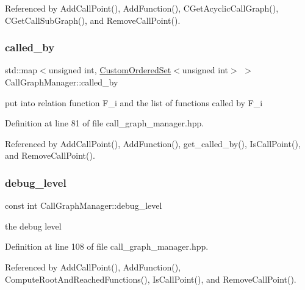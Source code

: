 Referenced by Add\+Call\+Point(), Add\+Function(), C\+Get\+Acyclic\+Call\+Graph(), C\+Get\+Call\+Sub\+Graph(), and Remove\+Call\+Point().

\mbox{\label{classCallGraphManager_a61a98173b9b7f8c3058227eb3e371d5c}} 
\subsubsection{\texorpdfstring{called\+\_\+by}{called\_by}}
{\footnotesize\ttfamily std\+::map$<$unsigned int, \hyperlink{classCustomOrderedSet}{Custom\+Ordered\+Set}$<$unsigned int$>$ $>$ Call\+Graph\+Manager\+::called\+\_\+by\hspace{0.3cm}{\ttfamily [private]}}



put into relation function F\+\_\+i and the list of functions called by F\+\_\+i 



Definition at line 81 of file call\+\_\+graph\+\_\+manager.\+hpp.



Referenced by Add\+Call\+Point(), Add\+Function(), get\+\_\+called\+\_\+by(), Is\+Call\+Point(), and Remove\+Call\+Point().

\mbox{\label{classCallGraphManager_a8905c760cbe8ffad17aa77bb57c572a9}} 
\subsubsection{\texorpdfstring{debug\+\_\+level}{debug\_level}}
{\footnotesize\ttfamily const int Call\+Graph\+Manager\+::debug\+\_\+level\hspace{0.3cm}{\ttfamily [private]}}



the debug level 



Definition at line 108 of file call\+\_\+graph\+\_\+manager.\+hpp.



Referenced by Add\+Call\+Point(), Add\+Function(), Compute\+Root\+And\+Reached\+Functions(), Is\+Call\+Point(), and Remove\+Call\+Point().

